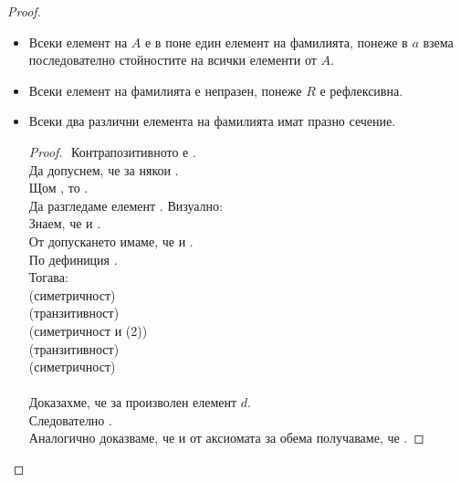 \begin{proof}
    $ $\newline
    \begin{itemize}
        \item Всеки елемент на \(A\) е в поне един елемент на фамилията, понеже в  
        \(a\) взема последователно стойностите на всички елементи от \(A\).
        \item Всеки елемент на фамилията е непразен, понеже \(R\) е рефлексивна.
        \item Всеки два различни елемента на фамилията имат празно сечение.
        \begin{lemma}
            \mexpr{[a] \not = [b] \to [a] \cap [b] = \emptyset}
            \begin{proof}
                $ $\newline
                Контрапозитивното е \mexpr{[a] \cap [b] \not = \emptyset \to [a] = [b]}. \\
                Да допуснем, че \mexpr{[a] \cap [b] \not = \emptyset} за някои . \\
                Щом \mexpr{[a] \cap [b] \not = \emptyset}, то . \\
                Да разгледаме елемент . Визуално: \\
                Знаем, че  и . \\
                От допускането имаме, че  и . \\
                По дефиниция . \\
                Тогава: \\
                 (симетричност) \\
                 (транзитивност) \\
                 (симетричност и (2)) \\
                 (транзитивност) \\
                 (симетричност) \\
                 \\
                Доказахме, че  за произволен елемент \(d\). \\
                Следователно \mexpr{[a] \subseteq [b]}. \\
                Аналогично доказваме, че \mexpr{[b] \subseteq [a]} и от аксиомата за обема получаваме, че
                \mexpr{[a] = [b]}.
            \end{proof}
        \end{lemma}
    \end{itemize}
\end{proof}
